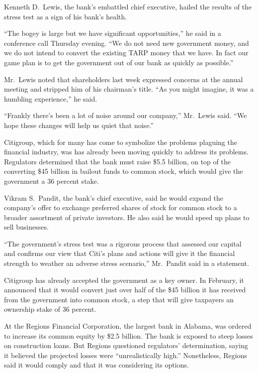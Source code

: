 \documentclass[12pt,a4paper,onecolumn]{article}
\begin{document}
Kenneth D.~Lewis, the bank's embattled chief executive, hailed the results of the stress test as a
sign of his bank's health.

``The bogey is large but we have significant opportunities,'' he said in a conference call Thursday
evening. ``We do not need new government money, and we do not intend to convert the existing TARP
money that we have. In fact our game plan is to get the government out of our bank as quickly as
possible.''

Mr.~Lewis noted that shareholders last week expressed concerns at the annual meeting and stripped
him of his chairman's title. ``As you might imagine, it was a humbling experience,'' he said.

``Frankly there's been a lot of noise around our company,'' Mr.~Lewis said. ``We hope these changes
will help us quiet that noise.''

Citigroup, which for many has come to symbolize the problems plaguing the financial industry, was
has already been moving quickly to address its problems. Regulators determined that the bank must
raise \$5.5 billion, on top of the converting \$45 billion in bailout funds to common stock, which
would give the government a 36 percent stake.

Vikram S.~Pandit, the bank's chief executive, said he would expand the company's offer to exchange
preferred shares of stock for common stock to a broader assortment of private investors. He also
said he would speed up plans to sell businesses.

``The government's stress test was a rigorous process that assessed our capital and confirms our
view that Citi's plans and actions will give it the financial strength to weather an adverse stress
scenario,'' Mr.~Pandit said in a statement.

Citigroup has already accepted the government as a key owner. In February, it announced that it
would convert just over half of the \$45 billion it has received from the government into common
stock, a step that will give taxpayers an ownership stake of 36 percent.

At the Regions Financial Corporation, the largest bank in Alabama, was ordered to increase its
common equity by \$2.5 billion. The bank is exposed to steep losses on construction loans. But
Regions questioned regulators' determination, saying it believed the projected losses were
``unrealistically high.'' Nonetheless, Regions said it would comply and that it was considering its
options.
\end{document}
